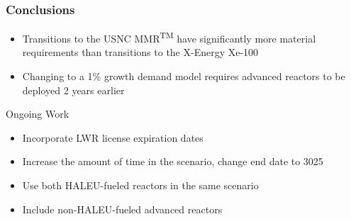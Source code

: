 \begin{frame}
    \frametitle{Conclusions}
    \begin{itemize}
        \item Transitions to the \gls{USNC} \gls{MMR}\textsuperscript{TM}
              have significantly more material requirements than transitions to 
              the X-Energy Xe-100
        \item Changing to a 1\% growth demand model requires 
              advanced reactors to be deployed 2 years earlier
    \end{itemize}
    \begin{block}{Ongoing Work}
        \begin{itemize}
            \item Incorporate \gls{LWR} license expiration dates
            \item Increase the amount of time in the scenario, change end date to 3025
            \item Use both \gls{HALEU}-fueled reactors in the same scenario
            \item Include non-\gls{HALEU}-fueled advanced reactors
        \end{itemize}
    \end{block}
\end{frame}
